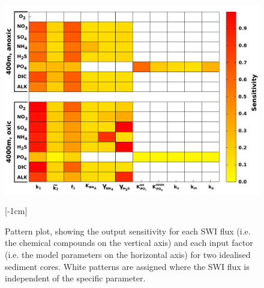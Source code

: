 \documentclass[gmd, manuscript]{copernicus}
\begin{document}
\begin{figure}[htbp]
\begin{center}
	\includegraphics[width=1.0\textwidth]{figures/SA/0_KSIndex_ALL_OUTPUT_13042017.pdf}
	\caption{Pattern plot, showing the output sensitivity for each SWI flux (i.e. the chemical compounds on the vertical axis) and each input factor (i.e. the model parameters 
	on the horizontal axis) for two idealised sediment cores. White patterns are assigned where the SWI flux is independent of the specific parameter. 
	}
	\label{fig:Sensitivity_Analysis}
	\end{center}
[-1cm]%
\end{figure}
\end{document}
